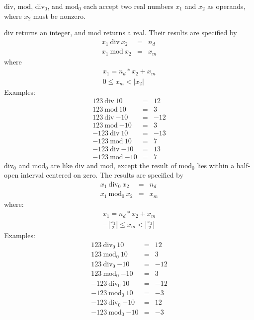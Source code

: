 $\mathrm{div}$, $\mathrm{mod}$, $\mathrm{div}_0$, and $\mathrm{mod}_0$
each accept two real numbers $x_1$ and $x_2$ as operands, where
$x_2$ must be nonzero.

$\mathrm{div}$ returns an integer, and $\mathrm{mod}$ returns a real.
Their results are specified by
%
\begin{eqnarray*}
x_1~\mathrm{div}~x_2 &=& n_d\\
x_1~\mathrm{mod}~x_2 &=& x_m
\end{eqnarray*}
%
where
%
\begin{displaymath}
\begin{array}{c}
x_1 = n_d * x_2 + x_m\\
0 \leq x_m < |x_2|
\end{array}
\end{displaymath}
%
Examples:
\begin{eqnarray*}
123~\mathrm{div}~10    &=&  12\\
123~\mathrm{mod}~10    &=&  3\\
123~\mathrm{div}~\textrm{$-10$}   &=&  -12\\
123~\mathrm{mod}~\textrm{$-10$}   &=&  3\\
-123~\mathrm{div}~10    &=&  -13\\
-123~\mathrm{mod}~10    &=&  7\\
-123~\mathrm{div}~\textrm{$-10$}   &=&  13\\
-123~\mathrm{mod}~\textrm{$-10$}   &=&  7
\end{eqnarray*}
%
$\mathrm{div}_0$ and $\mathrm{mod}_0$ are like $\mathrm{div}$ and
$\mathrm{mod}$, except the result of $\mathrm{mod}_0$ lies within a
half-open interval centered on zero.  The results are specified by
%
\begin{eqnarray*}
x_1~\mathrm{div}_0~x_2 &=& n_d\\
x_1~\mathrm{mod}_0~x_2 &=& x_m
\end{eqnarray*}
%
where:
%
\begin{displaymath}
\begin{array}{c}
x_1 = n_d * x_2 + x_m\\
-|\frac{x_2}{2}| \leq x_m < |\frac{x_2}{2}|
\end{array}
\end{displaymath}
%
Examples:
%
\begin{eqnarray*}
123~\mathrm{div}_0~10    &=&  12\\
123~\mathrm{mod}_0~10    &=&  3\\
123~\mathrm{div}_0~\textrm{$-10$}   &=&  -12\\
123~\mathrm{mod}_0~\textrm{$-10$}   &=&  3\\
-123~\mathrm{div}_0~10    &=&  -12\\
-123~\mathrm{mod}_0~10    &=&  -3\\
-123~\mathrm{div}_0~\textrm{$-10$}   &=&  12\\
-123~\mathrm{mod}_0~\textrm{$-10$}   &=&  -3
\end{eqnarray*}

